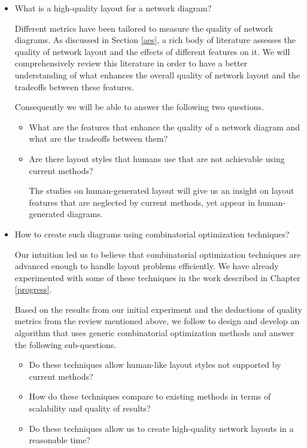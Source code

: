 \documentclass[a4paper,11pt,phdthesis,singlespace,twoside]{cssethesis}
\begin{document}
\begin{itemize}
\item What is a high-quality layout for a network diagram?

Different metrics have been tailored to measure the quality of network diagrams. As discussed in Section \ref{aes}, a rich body of literature assesses the quality of network layout and the effects of different features on it.
We will comprehensively review this literature in order to have a better understanding of what enhances the overall quality of network layout and the tradeoffs between these features.

Consequently we will be able to answer the following two questions.

\begin{itemize}

\item What are the features that enhance the quality of a network diagram and what are the tradeoffs between them?

\item Are there layout styles that humans use that are not achievable using current methods?

The studies on human-generated layout will give us an insight on layout features that are neglected by current methods, yet appear in human-generated diagrams.

\end{itemize}

\item How to create such diagrams using combinatorial optimization techniques?

Our intuition led us to believe that combinatorial optimization techniques are advanced enough to handle layout problems efficiently. We have already experimented with some of these techniques in the work described in Chapter \ref{progress}. 

Based on the results from our initial experiment and the deductions of quality metrics from the review mentioned above, we follow to design and develop an algorithm that uses generic combinatorial optimization methods and answer the following sub-questions.

\begin{itemize}
\item Do these techniques allow human-like layout styles not supported by current methods?

\item How do these techniques compare to existing methods in terms of scalability and quality of results?

\item Do these techniques allow us to create high-quality network layouts in a reasonable time?

\end{itemize}
\end{itemize}
\end{document}
